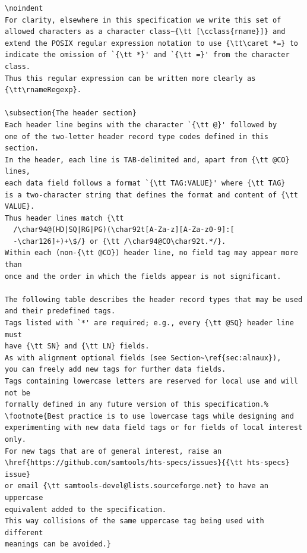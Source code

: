 \begin{verbatim}
\noindent
For clarity, elsewhere in this specification we write this set of allowed characters as a character class~{\tt [\cclass{rname}]} and extend the POSIX regular expression notation to use {\tt\caret *=} to indicate the omission of `{\tt *}' and `{\tt =}' from the character class.
Thus this regular expression can be written more clearly as {\tt\rnameRegexp}.

\subsection{The header section}
Each header line begins with the character `{\tt @}' followed by
one of the two-letter header record type codes defined in this section.
In the header, each line is TAB-delimited and, apart from {\tt @CO} lines,
each data field follows a format `{\tt TAG:VALUE}' where {\tt TAG}
is a two-character string that defines the format and content of {\tt VALUE}.
Thus header lines match {\tt
  /\char94@(HD|SQ|RG|PG)(\char92t[A-Za-z][A-Za-z0-9]:[
  -\char126]+)+\$/} or {\tt /\char94@CO\char92t.*/}.
Within each (non-{\tt @CO}) header line, no field tag may appear more than
once and the order in which the fields appear is not significant.

The following table describes the header record types that may be used
and their predefined tags.
Tags listed with `*' are required; e.g., every {\tt @SQ} header line must
have {\tt SN} and {\tt LN} fields.
As with alignment optional fields (see Section~\ref{sec:alnaux}),
you can freely add new tags for further data fields.
Tags containing lowercase letters are reserved for local use and will not be
formally defined in any future version of this specification.%
\footnote{Best practice is to use lowercase tags while designing and
experimenting with new data field tags or for fields of local interest only.
For new tags that are of general interest, raise an
\href{https://github.com/samtools/hts-specs/issues}{{\tt hts-specs} issue}
or email {\tt samtools-devel@lists.sourceforge.net} to have an uppercase
equivalent added to the specification.
This way collisions of the same uppercase tag being used with different
meanings can be avoided.}


\end{verbatim}
